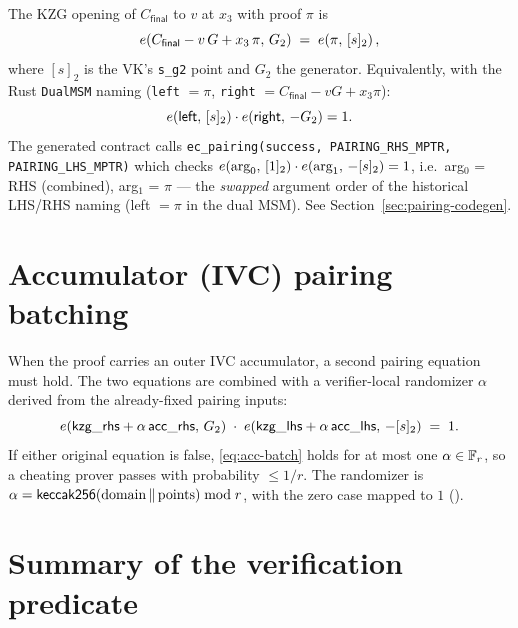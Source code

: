 The KZG opening of $C_{\mathsf{final}}$ to $v$ at $x_3$ with proof $\pi$ is
\begin{equation}
  e\!\left(C_{\mathsf{final}} - v\,G + x_3\,\pi,\,G_2\right)
  \;=\; e\!\left(\pi,\,[s]_2\right),
  \label{eq:final-pairing}
\end{equation}
where $[s]_2$ is the VK's \texttt{s\_\allowbreak{}g2} point and $G_2$ the generator.
Equivalently, with the Rust \texttt{DualMSM} naming
(\texttt{left} $= \pi$, \texttt{right} $= C_{\mathsf{final}} - vG + x_3\pi$):
\begin{equation}
  e\!\left(\mathsf{left},\,[s]_2\right) \cdot e\!\left(\mathsf{right},\,-G_2\right) = 1.
  \label{eq:final-pairing-dual}
\end{equation}
The generated contract calls
\texttt{ec\_\allowbreak{}pairing(success, PAIRING\_\allowbreak{}RHS\_\allowbreak{}MPTR, PAIRING\_\allowbreak{}LHS\_\allowbreak{}MPTR)}
which checks $e\!\left(\text{arg}_0,\,[1]_2\right)\cdot e\!\left(\text{arg}_1,\,-[s]_2\right)=1$,
i.e.\ arg$_0$ = RHS (combined), arg$_1$ = $\pi$ --- the \emph{swapped}
argument order of the historical LHS/RHS naming (left $= \pi$ in the dual
MSM). See Section~\ref{sec:pairing-codegen}.

\section{Accumulator (IVC) pairing batching}
\label{sec:acc-batch}

When the proof carries an outer IVC accumulator, a second pairing equation
must hold. The two equations are combined with a verifier-local randomizer
$\alpha$ derived from the already-fixed pairing inputs:
\begin{equation}
  e\!\left(\mathsf{kzg\_\allowbreak{}rhs} + \alpha\,\mathsf{acc\_\allowbreak{}rhs},\,G_2\right)
  \;\cdot\;
  e\!\left(\mathsf{kzg\_\allowbreak{}lhs} + \alpha\,\mathsf{acc\_\allowbreak{}lhs},\,-[s]_2\right)
  \;=\; 1.
  \label{eq:acc-batch}
\end{equation}
If either original equation is false, \eqref{eq:acc-batch} holds for at
most one $\alpha \in \mathbb{F}_r$, so a cheating prover passes with probability
$\le 1/r$. The randomizer is $\alpha = \mathsf{keccak256}(\text{domain}\,\|\,\text{points})
\bmod r$, with the zero case mapped to $1$ ().

\section{Summary of the verification predicate}
\label{sec:summary-predicate}

